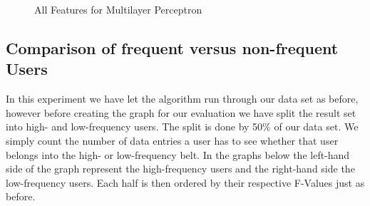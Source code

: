 \begin{figure}[H]
	\caption{All Features for Multilayer Perceptron}
\end{figure}


\newpage
\subsection{Comparison of frequent versus non-frequent Users}
In this experiment we have let the algorithm run through our data set as before, however before creating the graph for our evaluation we have split the result set into high- and low-frequency users. The split is done by 50\% of our data set. We simply count the number of data entries a user has to see whether that user belongs into the high- or low-frequency belt. In the graphs below the left-hand side of the graph represent the high-frequency users and the right-hand side the low-frequency users. Each half is then ordered by their respective F-Values just as before.

